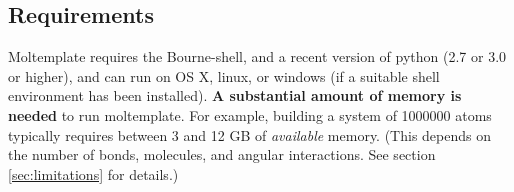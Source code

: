\documentclass[11pt]{article}
\begin{document}

\subsection*{Requirements}

Moltemplate requires the Bourne-shell, and a recent version of python (2.7 or 3.0 or higher), and can run on OS X, linux, or windows (if a suitable shell environment has been installed).  
\textbf{A substantial amount of memory is needed} to run moltemplate.
For example, building a system of 1000000 atoms typically requires 
between 3 and 12 GB of \textit{available} memory.
(This depends on the number of bonds, molecules, and angular interactions.
 See section \ref{sec:limitations} for details.)

\end{document}
